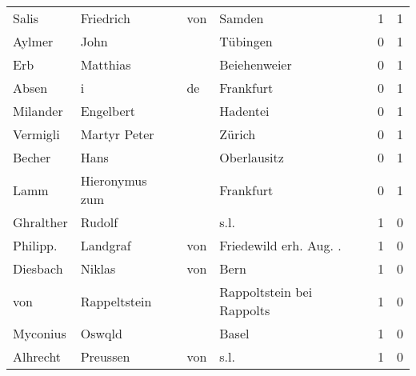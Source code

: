 \begin{center}
\begin{tiny}
\begin{longtabu}{llllrr}
                    Salis &                          Friedrich &         von &                                      Samden &          1 &         1 \\
                   Aylmer &                               John &             &                                    Tübingen &          0 &         1 \\
                      Erb &                           Matthias &             &                                Beiehenweier &          0 &         1 \\
                    Absen &                                  i &          de &                                   Frankfurt &          0 &         1 \\
                 Milander &                          Engelbert &             &                                    Hadentei &          0 &         1 \\
                 Vermigli &                       Martyr Peter &             &                                      Zürich &          0 &         1 \\
                   Becher &                               Hans &             &                                 Oberlausitz &          0 &         1 \\
                     Lamm &                     Hieronymus zum &             &                                   Frankfurt &          0 &         1 \\
                Ghralther &                             Rudolf &             &                                        s.l. &          1 &         0 \\
                 Philipp. &                           Landgraf &         von &                     Friedewild erh. Aug. .  &          1 &         0 \\
                 Diesbach &                             Niklas &         von &                                        Bern &          1 &         0 \\
                      von &                       Rappeltstein &             &                   Rappoltstein bei Rappolts &          1 &         0 \\
                 Myconius &                             Oswqld &             &                                       Basel &          1 &         0 \\
                 Alhrecht &                           Preussen &         von &                                        s.l. &          1 &         0 \\

\end{longtabu}
\end{tiny}
\end{center}
